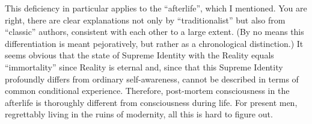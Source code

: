 \begin{footnotesize}
\begin{sffamily}
This deficiency in particular applies to the ``afterlife'', which I mentioned. You are right, there are clear explanations not only by ``traditionalist'' but also from ``classic'' authors, consistent with each other to a large extent. (By no means this differentiation is meant pejoratively, but rather as a chronological distinction.) It seems obvious that the state of Supreme Identity with the Reality equals ``immortality'' since Reality is eternal and, since that this Supreme Identity profoundly differs from ordinary self-awareness, cannot be described in terms of common conditional experience. Therefore, post-mortem consciousness in the afterlife is thoroughly different from consciousness during life. For present men, regrettably living in the ruins of modernity, all this is hard to figure out.

\hfill

\end{sffamily}
\end{footnotesize}


